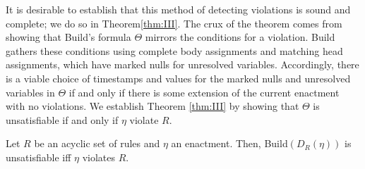 It is desirable to establish that this method of detecting violations is sound and complete;
we do so in Theorem\:\ref{thm:III}.
The crux of the theorem comes from showing that {\sf Build}'s formula $\Theta$
mirrors the conditions for a violation.
{\sf Build} gathers these conditions
using complete body assignments and matching head assignments,
which have marked nulls for unresolved variables.
Accordingly,
there is a viable choice of timestamps and values
for the marked nulls and unresolved variables in $\Theta$
if and only if
there is some extension of the current enactment with no violations.
We establish Theorem \ref{thm:III} by showing
that $\Theta$ is unsatisfiable if and only if
$\eta$ violate $R$.

\begin{thm}\label{thm:III}
  Let $R$ be an acyclic set of rules
  and
  $\eta$ an enactment.
  Then,
  {\sf Build}$(D_{R}(\eta))$ is unsatisfiable
  iff
  $\eta$ violates $R$.
\end{thm}

